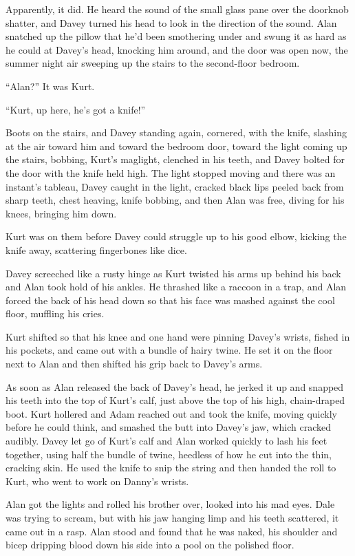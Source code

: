 Apparently, it did.  He heard the sound of the small glass pane over
the doorknob shatter, and Davey turned his head to look in the
direction of the sound.  Alan snatched up the pillow that he'd been
smothering under and swung it as hard as he could at Davey's head,
knocking him around, and the door was open now, the summer night air
sweeping up the stairs to the second-floor bedroom.

``Alan?'' It was Kurt.

``Kurt, up here, he's got a knife!''

Boots on the stairs, and Davey standing again, cornered, with the
knife, slashing at the air toward him and toward the bedroom door,
toward the light coming up the stairs, bobbing, Kurt's maglight,
clenched in his teeth, and Davey bolted for the door with the knife
held high.  The light stopped moving and there was an instant's
tableau, Davey caught in the light, cracked black lips peeled back
from sharp teeth, chest heaving, knife bobbing, and then Alan was
free, diving for his knees, bringing him down.

Kurt was on them before Davey could struggle up to his good elbow,
kicking the knife away, scattering fingerbones like dice.

Davey screeched like a rusty hinge as Kurt twisted his arms up behind
his back and Alan took hold of his ankles.  He thrashed like a raccoon
in a trap, and Alan forced the back of his head down so that his face
was mashed against the cool floor, muffling his cries.

Kurt shifted so that his knee and one hand were pinning Davey's
wrists, fished in his pockets, and came out with a bundle of hairy
twine.  He set it on the floor next to Alan and then shifted his grip
back to Davey's arms.

As soon as Alan released the back of Davey's head, he jerked it up and
snapped his teeth into the top of Kurt's calf, just above the top of
his high, chain-draped boot.  Kurt hollered and Adam reached out and
took the knife, moving quickly before he could think, and smashed the
butt into Davey's jaw, which cracked audibly.  Davey let go of Kurt's
calf and Alan worked quickly to lash his feet together, using half the
bundle of twine, heedless of how he cut into the thin, cracking skin. 
He used the knife to snip the string and then handed the roll to Kurt,
who went to work on Danny's wrists.

Alan got the lights and rolled his brother over, looked into his mad
eyes.  Dale was trying to scream, but with his jaw hanging limp and
his teeth scattered, it came out in a rasp.  Alan stood and found that
he was naked, his shoulder and bicep dripping blood down his side into
a pool on the polished floor.

